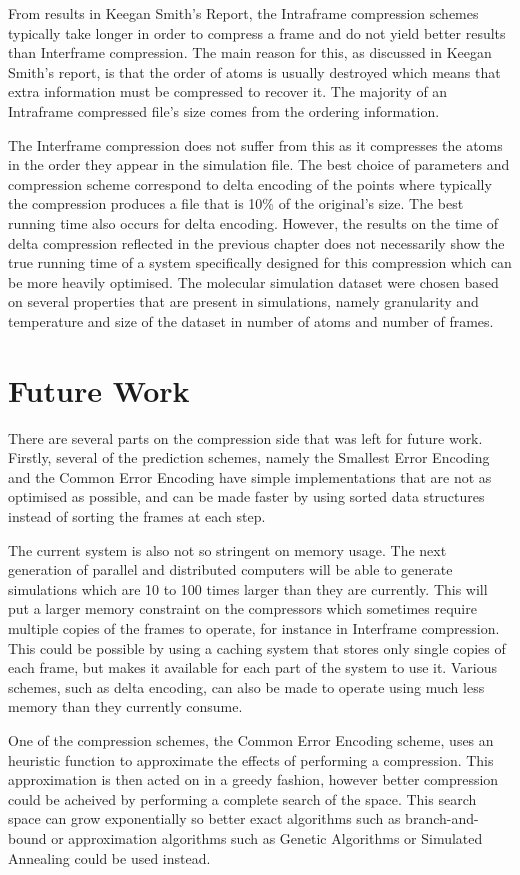 \documentclass[a4paper,11pt]{report}
\begin{document}
From results in Keegan Smith's Report, the Intraframe compression schemes typically take longer in order to compress a frame and do not yield better results than Interframe compression. The main reason for this, as discussed in Keegan Smith's report, is that the order of atoms is usually destroyed which means that extra information must be compressed to recover it. The majority of an Intraframe compressed file's size comes from the ordering information.

The Interframe compression does not suffer from this as it compresses the atoms in the order they appear in the simulation file. The best choice of parameters and compression scheme correspond to delta encoding of the points where typically the compression produces a file that is 10\% of the original's size. The best running time also occurs for delta encoding. However, the results on the time of delta compression reflected in the previous chapter does not necessarily show the true running time of a system specifically designed for this compression which can be more heavily optimised. The molecular simulation dataset were chosen based on several properties that are present in simulations, namely granularity and temperature and size of the dataset in number of atoms and number of frames.

\section{Future Work}

There are several parts on the compression side that was left for future work. Firstly, several of the prediction schemes, namely the Smallest Error Encoding and the Common Error Encoding have simple implementations that are not as optimised as possible, and can be made faster by using sorted data structures instead of sorting the frames at each step. 

The current system is also not so stringent on memory usage. The next generation of parallel and distributed computers will be able to generate simulations which are 10 to 100 times larger than they are currently. This will put a larger memory constraint on the compressors which sometimes require multiple copies of the frames to operate, for instance in Interframe compression. This could be possible by using a caching system that stores only single copies of each frame, but makes it available for each part of the system to use it. Various schemes, such as delta encoding, can also be made to operate using much less memory than they currently consume.

One of the compression schemes, the Common Error Encoding scheme, uses an heuristic function to approximate the effects of performing a compression. This approximation is then acted on in a greedy fashion, however better compression could be acheived by performing a complete search of the space. This search space can grow exponentially so better exact algorithms such as branch-and-bound or approximation algorithms such as Genetic Algorithms or Simulated Annealing could be used instead.


\end{document}
